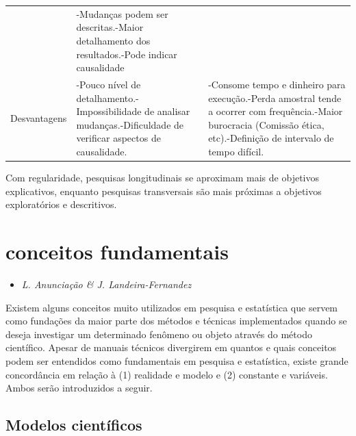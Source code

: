 \documentclass[
]{book}
\providecommand{\tightlist}{%
  \setlength{\itemsep}{0pt}\setlength{\parskip}{0pt}}
\begin{document}
\begin{longtable}[]{@{}lll@{}}
\begin{minipage}[t]{0.29\columnwidth}
\end{minipage} & \begin{minipage}[t]{0.31\columnwidth}\raggedright
-Mudanças podem ser descritas.-Maior detalhamento dos resultados.-Pode indicar causalidade\strut
\end{minipage}\tabularnewline
\begin{minipage}[t]{0.31\columnwidth}\raggedright
Desvantagens\strut
\end{minipage} & \begin{minipage}[t]{0.29\columnwidth}\raggedright
-Pouco nível de detalhamento.-Impossibilidade de analisar mudanças.-Dificuldade de verificar aspectos de causalidade.\strut
\end{minipage} & \begin{minipage}[t]{0.31\columnwidth}\raggedright
-Consome tempo e dinheiro para execução.-Perda amostral tende a ocorrer com frequência.-Maior burocracia (Comissão ética, etc).-Definição de intervalo de tempo difícil.\strut
\end{minipage}\tabularnewline
\bottomrule
\end{longtable}

Com regularidade, pesquisas longitudinais se aproximam mais de objetivos explicativos, enquanto pesquisas transversais são mais próximas a objetivos exploratórios e descritivos.

\hypertarget{conceitos-fundamentais}{%
\section{conceitos fundamentais}\label{conceitos-fundamentais}}

\begin{itemize}
\tightlist
\item
  \emph{L. Anunciação \& J. Landeira-Fernandez}
\end{itemize}

Existem alguns conceitos muito utilizados em pesquisa e estatística que servem como fundações da maior parte dos métodos e técnicas implementados quando se deseja investigar um determinado fenômeno ou objeto através do método científico. Apesar de manuais técnicos divergirem em quantos e quais conceitos podem ser entendidos como fundamentais em pesquisa e estatística, existe grande concordância em relação à (1) realidade e modelo e (2) constante e variáveis. Ambos serão introduzidos a seguir.

\hypertarget{modelos-cientuxedficos}{%
\subsection{Modelos científicos}\label{modelos-cientuxedficos}}
\end{document}
